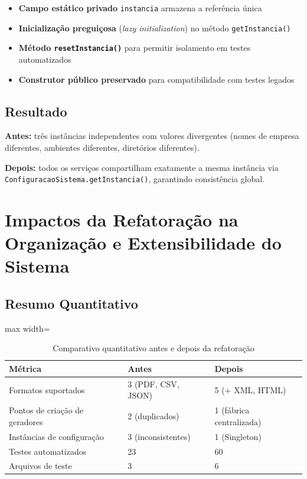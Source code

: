 \documentclass[12pt, a4paper]{article}
\begin{document}
\begin{itemize}
    \item \textbf{Campo estático privado} \texttt{instancia} armazena a referência única
    \item \textbf{Inicialização preguiçosa} (\textit{lazy initialization}) no método \texttt{getInstancia()}
    \item \textbf{Método \texttt{resetInstancia()}} para permitir isolamento em testes automatizados
    \item \textbf{Construtor público preservado} para compatibilidade com testes legados
\end{itemize}

\subsection{Resultado}

\textbf{Antes:} três instâncias independentes com valores divergentes (nomes de empresa diferentes, ambientes diferentes, diretórios diferentes).

\textbf{Depois:} todos os serviços compartilham exatamente a mesma instância via \texttt{ConfiguracaoSistema.getInstancia()}, garantindo consistência global.

\section{Impactos da Refatoração na Organização e Extensibilidade do Sistema}

\subsection{Resumo Quantitativo}

\begin{table}[h!]
\centering
\begin{adjustbox}{max width=\textwidth}
\begin{tabular}{lll}
\toprule
\textbf{Métrica} & \textbf{Antes} & \textbf{Depois} \\
\midrule
Formatos suportados             & 3 (PDF, CSV, JSON)   & 5 (+ XML, HTML)            \\
Pontos de criação de geradores  & 2 (duplicados)       & 1 (fábrica centralizada)   \\
Instâncias de configuração      & 3 (inconsistentes)   & 1 (Singleton)              \\
Testes automatizados            & 23                   & 60                         \\
Arquivos de teste               & 3                    & 6                          \\
\bottomrule
\end{tabular}
\end{adjustbox}
\caption{Comparativo quantitativo antes e depois da refatoração}
\end{table}
\end{document}
